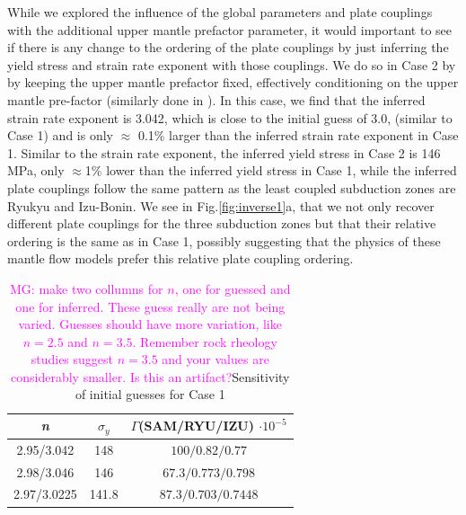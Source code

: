 \documentclass[12pt]{article}
\newcommand{\mgnote}[1]{\textcolor{magenta}{MG: #1}}
\begin{document}
	
While we explored the influence of the global parameters and plate couplings with the additional upper mantle prefactor parameter, it would important to see if there is any change to the ordering of the plate couplings by just inferring the yield stress and strain rate exponent with those couplings. We do so in Case 2 by  by keeping the upper mantle prefactor fixed, effectively conditioning on the upper mantle pre-factor (similarly done in \citep{ratnaswamy2015adjoint}). In this case, we find that the inferred strain rate exponent is 3.042, which is close to the initial guess of 3.0, (similar to Case 1) and is only $\approx$ 0.1\% larger than the inferred strain rate exponent in Case 1. Similar to the strain rate exponent, the inferred yield stress in Case 2 is 146 MPa, only $\approx$1\% lower than the inferred yield stress in Case 1, while the inferred plate couplings follow the same pattern as the least coupled subduction zones are Ryukyu and Izu-Bonin. We see in Fig.\ref{fig:inverse1}a, that we not only recover different plate couplings for the three subduction zones but that their relative ordering is the same as in Case 1, possibly suggesting that the physics of these mantle flow models prefer this relative plate coupling ordering. 

\begin{table}[H]
		\caption{\mgnote{make two collumns for $n$, one for guessed and one for inferred. These guess really are not being varied. Guesses should have more variation, like $n=2.5$ and $n=3.5$. Remember rock rheology studies suggest $n=3.5$ and your values are considerably smaller. Is this an artifact?}Sensitivity of initial guesses for Case 1} %
		\centering  %
		\begin{tabular}{ c c c } %
		\hline \hline                        %
		 \textit{n} &$\sigma_y$&$\Gamma $(SAM/RYU/IZU) $\cdot 10^{-5}$   \\ [0.5ex] %
		\hline                  %
	         2.95/3.042 & 148 & $100/0.82/0.77$    \\
	         2.98/3.046 & 146 & $67.3/0.773/0.798$  \\
	        2.97/3.0225 & 141.8 & $87.3/0.703/0.7448$  \\             
                \hline %
		\end{tabular}
		\label{table:initial_guess} %
		\end{table}
\end{document}
